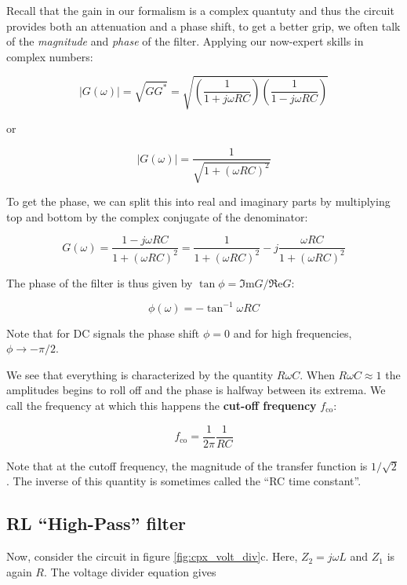 \documentclass{tufte-book}
\begin{document}
Recall that the gain in our formalism is a complex quantuty and thus the circuit provides both an attenuation and a phase shift, to get a better grip, we often talk of the \textit{magnitude} and \textit{phase} of the filter. Applying our now-expert skills in complex numbers:

$$
\vert G(\omega)\vert = \sqrt{GG^*} = \sqrt{\left(\frac{1}{1+j\omega RC}\right)\left(\frac{1}{1-j\omega RC}\right)}
$$

or

\begin{equation}\label{eq:mag_RCLPfilt}
\vert G(\omega)\vert  = \frac{1}{\sqrt{1+\left(\omega R C\right)^2}}
\end{equation}


\noindent To get the phase, we can split this into real and imaginary parts by multiplying top and bottom by the complex conjugate of the denominator:

$$
G(\omega) = \frac{1-j\omega RC}{1+\left(\omega RC\right)^2} =  \frac{1}{1+\left(\omega RC\right)^2} - j \frac{\omega RC}{1+\left(\omega RC\right)^2}
$$

\noindent The phase of the filter is thus given by $\tan\phi = \Im\text{m}G/\Re\text{e}G$:

\begin{equation}\label{eq:phs_RCLPfilt}
\phi(\omega) = -\tan^{-1}\omega R C
\end{equation}

\noindent Note that for DC signals the phase shift $\phi = 0$ and for high frequencies, $\phi \rightarrow -\pi/2$.

We see that everything is characterized by the quantity $R\omega C$. When $R\omega C \approx 1$ the amplitudes begins to roll off and the phase is halfway between its extrema. We call the frequency at which this happens the \textbf{cut-off frequency} $f_\text{co}$:

\begin{equation}\label{eq:f_cutoff_RC}
f_\text{co} = \frac{1}{2\pi}\frac{1}{RC}
\end{equation}

\noindent Note that at the cutoff frequency, the magnitude of the transfer function is $1/\sqrt{2}$. The inverse of this quantity is sometimes called the ``RC time constant''.

\subsection{RL ``High-Pass'' filter}
Now, consider the circuit in figure \ref{fig:cpx_volt_div}c. Here, $Z_2 = j\omega L$ and $Z_1$ is again $R$. The voltage divider equation gives
\end{document}
